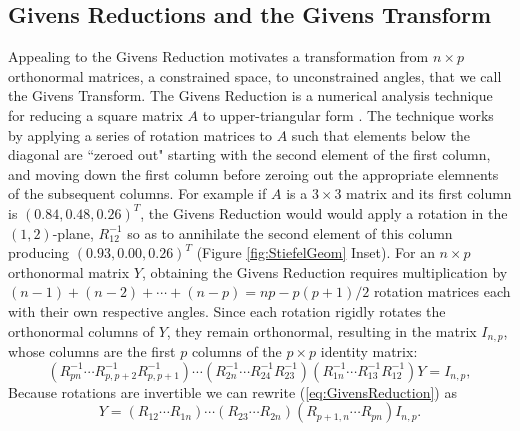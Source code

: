 \documentclass{article}
\begin{document}
\subsection{Givens Reductions and the Givens Transform}\label{GivensSub}
Appealing to the Givens Reduction motivates a transformation from $n \times p$ orthonormal matrices, a constrained space, to unconstrained angles, that we call the Givens Transform. The Givens Reduction is a numerical analysis technique for reducing a square matrix $A$ to upper-triangular form \citep{meyer2000matrix}. The technique works by applying a series of rotation matrices to $A$ such that elements below the diagonal are ``zeroed out" starting with the second element of the first column, and moving down the first column before zeroing out the appropriate elemnents of the subsequent columns. For example if $A$ is a $3 \times 3$ matrix and its first column is $(0.84, 0.48, 0.26)^T$, the Givens Reduction would would apply a rotation in the $(1,2)$-plane, $R_{12}^{-1}$ so as to annihilate the second element of this column producing $(0.93, 0.00, 0.26)^T$ (Figure \ref{fig:StiefelGeom} Inset). For an $n \times p$ orthonormal matrix $Y$, obtaining the Givens Reduction requires multiplication by $(n-1)+(n-2)+\cdots+(n-p) = np -p(p+1)/2$ rotation matrices each with their own respective angles. Since each rotation rigidly rotates the orthonormal columns of $Y$, they remain orthonormal, resulting in the matrix $I_{n,p}$, whose columns are the first $p$ columns of the $p \times p$ identity matrix:
\begin{equation}
\label{eq:GivensReduction}
(R_{pn}^{-1} \cdots R_{p,p+2}^{-1} R_{p,p+1}^{-1}) \cdots (R_{2n}^{-1} \cdots R_{24}^{-1} R_{23}^{-1})(R_{1n}^{-1} \cdots R_{13}^{-1}  R_{12}^{-1})Y = I_{n,p},
\end{equation}
Because rotations are invertible we can rewrite (\ref{eq:GivensReduction}) as
\begin{equation}
\label{eq:GivensRepresentation}
Y = (R_{12} \cdots R_{1n}) \cdots (R_{23} \cdots R_{2n}) (R_{p+1,n} \cdots R_{pn}) I_{n,p}.
\end{equation}
\end{document}
